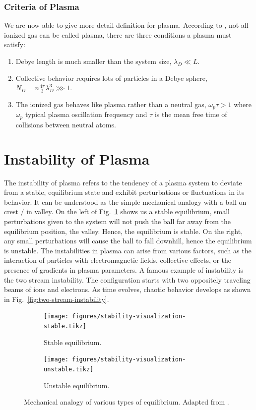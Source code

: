 \subsubsection*{Criteria of Plasma}
We are now able to give more detail definition for plasma. According to \cite{chen_introduction_2016}, not all ionized gas can be called plasma, there are three conditions a plasma must satisfy:
\begin{enumerate}
	\item Debye length is much smaller than the system size, $\lambda_D \ll L$.
	\item Collective behavior requires lots of particles in a Debye sphere, $N_D = n\frac{4\pi}{3}\lambda_D^3 \ggg 1$.
	\item The ionized gas behaves like plasma rather than a neutral gas, $\omega_p\tau > 1$ where $\omega_p$ typical plasma oscillation frequency and $\tau$ is the mean free time of collisions between neutral atoms.
\end{enumerate}

\section{Instability of Plasma} \label{sec:instability-of-plasma-flow}
The instability of plasma refers to the tendency of a plasma system to deviate from a stable, equilibrium state and exhibit perturbations or fluctuations in its behavior. It can be understood as the simple mechanical analogy with a ball on crest / in valley. On the left of Fig.~\ref{fig:stability-visualization} shows us a stable equilibrium, small perturbations given to the system will not push the ball far away from the equilibrium position, the valley. Hence, the equilibrium is stable. On the right, any small perturbations will cause the ball to fall downhill, hence the equilibrium is unstable. The instabilities in plasma can arise from various factors, such as the interaction of particles with electromagnetic fields, collective effects, or the presence of gradients in plasma parameters. A famous example of instability is the two stream instability. The configuration starts with two oppositely traveling beams of ions and electrons. As time evolves, chaotic behavior develops as shown in Fig.~\ref{fig:two-stream-instability}.

\begin{figure}[htbp]
	\centering
	\begin{subfigure}[b]{0.5\textwidth}
		\centering
		\texttt{[image: figures/stability-visualization-stable.tikz]}
		\caption{Stable equilibrium.}
	\end{subfigure}%
	\begin{subfigure}[b]{0.5\textwidth}
		\centering
		\texttt{[image: figures/stability-visualization-unstable.tikz]}
		\caption{Unstable equilibrium.}
	\end{subfigure}
	\caption{Mechanical analogy of various types of equilibrium. Adapted from \cite{chen_introduction_2016}.}
	\label{fig:stability-visualization}
\end{figure}

